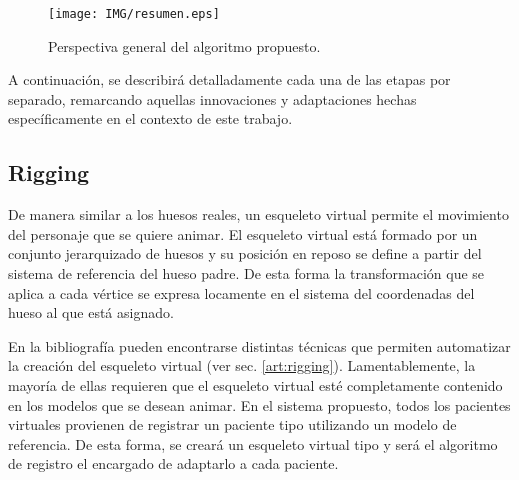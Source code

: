 \begin{figure}[!th]
   \centering
    \texttt{[image: IMG/resumen.eps]}%
    \caption{Perspectiva general del algoritmo propuesto.}
		\label{fig:Resumen}
\end{figure}


%

A continuación, se describirá detalladamente cada una de las etapas por separado, remarcando aquellas innovaciones y adaptaciones hechas específicamente en el contexto de este trabajo.



\subsection{Rigging}
\label{posing:rigging}
De manera similar a los huesos reales, un esqueleto virtual permite el movimiento del personaje que se quiere animar. El esqueleto virtual está formado por un conjunto jerarquizado de huesos y su posición en reposo se define a partir del sistema de referencia del hueso padre. De esta forma\new{,} la transformación que se aplica a cada vértice se expresa locamente en el sistema del coordenadas del hueso al que está asignado.  %



En la bibliografía pueden encontrarse distintas técnicas que permiten automatizar la creación del esqueleto virtual (ver sec. \ref{art:rigging}). Lamentablemente, la mayoría de ellas requieren que el esqueleto virtual esté completamente contenido en los modelos que se desean animar. En el sistema propuesto, todos los pacientes virtuales provienen de registrar un paciente tipo utilizando un modelo de referencia.  De esta forma, se creará un esqueleto virtual tipo y será el algoritmo de registro el encargado de adaptarlo a cada paciente.  %

